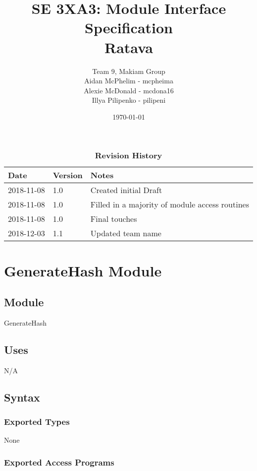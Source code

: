 \documentclass[12pt, titlepage]{article}
\title{SE 3XA3: Module Interface Specification\\Ratava}
\author{Team 9, Makiam Group
		\\ Aidan McPhelim - mcpheima
		\\ Alexie McDonald - mcdona16
		\\ Illya Pilipenko - pilipeni
}
\date{\today}
\begin{document}
\maketitle

\tableofcontents
\listoftables
\listoffigures

\begin{table}[bp]
\caption{\bf Revision History}
\begin{tabularx}{\textwidth}{p{3cm}p{2cm}X}
\toprule {\bf Date} & {\bf Version} & {\bf Notes}\\
\midrule
2018-11-08 & 1.0 & Created initial Draft\\
2018-11-08 & 1.0 & Filled in a majority of module access routines\\
2018-11-08 & 1.0 & Final touches\\
2018-12-03 & 1.1 & Updated team name\\
\bottomrule
\end{tabularx}
\end{table}

\newpage

\section*{GenerateHash Module}

\subsection*{Module}

GenerateHash

\subsection* {Uses}

N/A

\subsection* {Syntax}

\subsubsection* {Exported Types}

None

\subsubsection* {Exported Access Programs}
\end{document}
